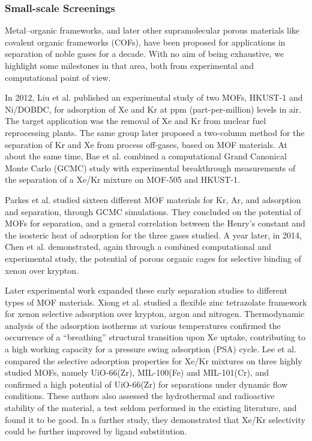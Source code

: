 \documentclass[main.tex]{subfiles}
\begin{document}
\subsubsection{Small-scale Screenings}

Metal--organic frameworks, and later other supramolecular porous materials like covalent organic frameworks (COFs), have been proposed for applications in separation of noble gases for a decade. With no aim of being exhaustive, we highlight some milestones in that area, both from experimental and computational point of view.

In 2012, Liu et al.\cite{Liu_2012} published an experimental study of two MOFs, HKUST-1 and Ni/DOBDC, for adsorption of Xe and Kr at ppm (part-per-million) levels in air. The target application was the removal of Xe and Kr from nuclear fuel reprocessing plants. The same group later proposed a two-column method for the separation of Kr and Xe from process off-gases\cite{Liu_2014}, based on MOF materials. At about the same time, Bae et al.\cite{Bae_2013} combined a computational Grand Canonical Monte Carlo (GCMC) study with experimental breakthrough measurements of the separation of a Xe/Kr mixture on MOF-505 and HKUST-1.

Parkes et al.\cite{Parkes_2013} studied sixteen different MOF materials for Kr, Ar, and  adsorption and separation, through GCMC simulations. They concluded on the potential of MOFs for separation, and a general correlation between the Henry's constant and the isosteric heat of adsorption for the three gases studied. A year later, in 2014, Chen et al.\cite{Chen_2014} demonstrated, again through a combined computational and experimental study, the potential of porous organic cages for selective binding of xenon over krypton.

Later experimental work expanded these early separation studies to different types of MOF materials. Xiong et al.\cite{Xiong_2015} studied a flexible zinc tetrazolate framework for xenon selective adsorption over krypton, argon and nitrogen. Thermodynamic analysis of the adsorption isotherms at various temperatures confirmed the occurrence of a ``breathing'' structural transition upon Xe uptake, contributing to a high working capacity for a pressure swing adsorption (PSA) cycle. Lee et al.\cite{Lee_2016} compared the selective adsorption properties for Xe/Kr mixtures on three highly studied MOFs, namely UiO-66(Zr), MIL-100(Fe) and MIL-101(Cr), and confirmed a high potential of UiO-66(Zr) for separations under dynamic flow conditions. These authors also assessed the hydrothermal and radioactive stability of the material, a test seldom performed in the existing literature, and found it to be good. In a further study,\cite{Lee_2018} they demonstrated that Xe/Kr selectivity could be further improved by ligand substitution.
\end{document}
